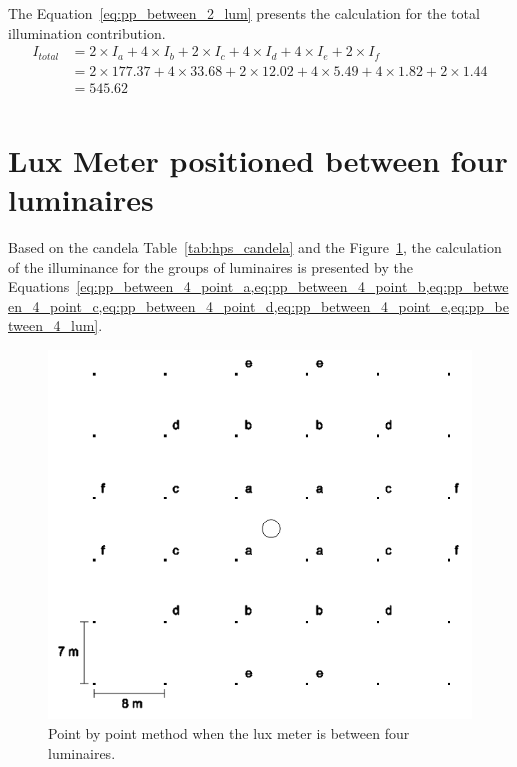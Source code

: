 The Equation~\ref{eq:pp_between_2_lum} presents the calculation for the total illumination contribution.
\begin{equation}
\begin{split}
I_{total} &= 2 \times I_a + 4 \times I_b + 2 \times I_c + 4 \times I_d + 4 \times I_e + 2 \times I_f \\
 &= 2 \times 177.37 + 4 \times 33.68 + 2 \times 12.02 + 4 \times 5.49 + 4 \times 1.82 + 2 \times 1.44 \\
 & = 545.62 \\
\end{split}
\label{eq:pp_between_2_lum}
\end{equation}

\section{Lux Meter positioned between four luminaires}
Based on the candela Table~\ref{tab:hps_candela} and the Figure~\ref{fig:pp_between_4_lum}, the calculation of the illuminance for the groups of luminaires is presented by the Equations~\cref{eq:pp_between_4_point_a,eq:pp_between_4_point_b,eq:pp_between_4_point_c,eq:pp_between_4_point_d,eq:pp_between_4_point_e,eq:pp_between_4_lum}.

\begin{figure}[h!]
\centering
\includegraphics[width=.5\textwidth]{./figs/pp_between_4_lum.png}
\caption{Point by point method when the lux meter is between four luminaires.}
\label{fig:pp_between_4_lum}
\end{figure}

